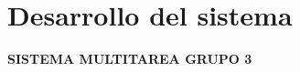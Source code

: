 \documentclass[12pt,a4paper]{article}
\begin{document}

\newpage

\section{\textcolor{azulUNEMI}{Desarrollo del sistema}}

\vspace{0.3cm}



\begin{center}
	{\LARGE\bfseries\textcolor{pseString}{SISTEMA MULTITAREA GRUPO 3}}
\end{center}
\vspace{0.5cm}
\noindent
\end{document}
